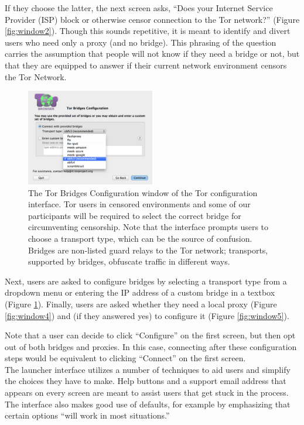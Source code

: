 \documentclass{template}
\begin{document}
If they choose the latter, the next screen asks, ``Does your Internet Service
Provider (ISP) block or otherwise censor connection to the Tor network?''
(Figure \ref{fig:window2}). Though this sounds repetitive, it is meant to
identify and divert users who need only a proxy (and no bridge).
This phrasing of the question carries the assumption that people will
not know if they need a bridge or not, but that they are equipped to answer if their
current network environment censors the Tor Network. 

\begin{figure}[h]
\label{fig:bridges}
  \centering
    \includegraphics[width=0.5\textwidth]{configuration-screenshot.png}
    \caption{The Tor Bridges Configuration window of the Tor configuration
    interface. Tor users in censored environments and some of our participants
    will be required to select the correct bridge for circumventing censorship.
    Note that the interface prompts users to choose a transport type, which can be
    the source of confusion. Bridges are non-listed guard relays to the Tor
    network; transports, supported by bridges, obfuscate traffic in
    different ways.}
\end{figure}

Next, users are asked to configure bridges by selecting a transport type from a
dropdown menu or entering the IP address of a custom bridge in a textbox (Figure
\ref{fig:bridges}).
Finally, users are asked whether they need a local proxy (Figure
\ref{fig:window4}) and (if they answered yes) to configure it (Figure
\ref{fig:window5}).

Note that a user can decide to click ``Configure'' on the first screen, but then
opt out of both bridges and proxies.
In this case, connecting after these configuration steps
would be equivalent to clicking ``Connect'' on the first screen. \\ 

The launcher interface utilizes a number of techniques to aid users and simplify
the choices they have to make. Help buttons and a support email address that
appears on every screen are meant to assist users that get stuck in the process.
The interface also makes good use of defaults, for example by emphasizing that
certain options ``will work in most situations.''
\end{document}
